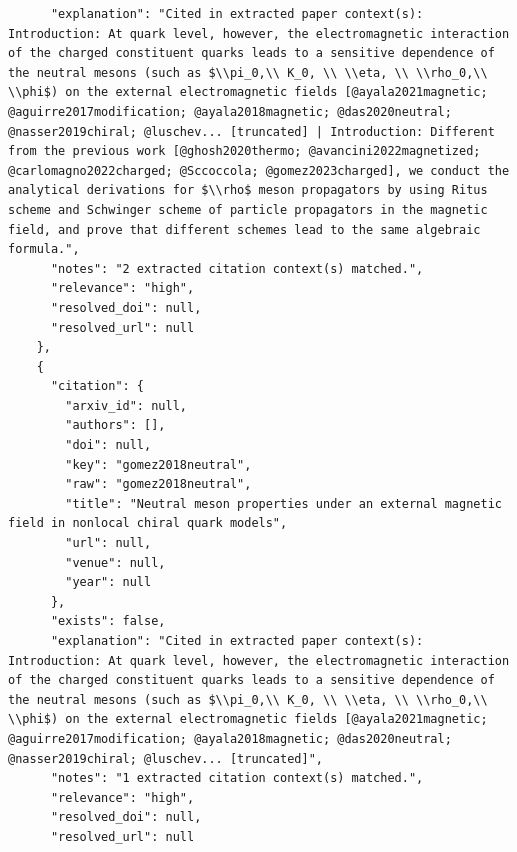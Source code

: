 \documentclass[11pt]{article}
\begin{document}
\begin{verbatim}
      "explanation": "Cited in extracted paper context(s): Introduction: At quark level, however, the electromagnetic interaction of the charged constituent quarks leads to a sensitive dependence of the neutral mesons (such as $\\pi_0,\\ K_0, \\ \\eta, \\ \\rho_0,\\ \\phi$) on the external electromagnetic fields [@ayala2021magnetic; @aguirre2017modification; @ayala2018magnetic; @das2020neutral; @nasser2019chiral; @luschev... [truncated] | Introduction: Different from the previous work [@ghosh2020thermo; @avancini2022magnetized; @carlomagno2022charged; @Sccoccola; @gomez2023charged], we conduct the analytical derivations for $\\rho$ meson propagators by using Ritus scheme and Schwinger scheme of particle propagators in the magnetic field, and prove that different schemes lead to the same algebraic formula.",
      "notes": "2 extracted citation context(s) matched.",
      "relevance": "high",
      "resolved_doi": null,
      "resolved_url": null
    },
    {
      "citation": {
        "arxiv_id": null,
        "authors": [],
        "doi": null,
        "key": "gomez2018neutral",
        "raw": "gomez2018neutral",
        "title": "Neutral meson properties under an external magnetic field in nonlocal chiral quark models",
        "url": null,
        "venue": null,
        "year": null
      },
      "exists": false,
      "explanation": "Cited in extracted paper context(s): Introduction: At quark level, however, the electromagnetic interaction of the charged constituent quarks leads to a sensitive dependence of the neutral mesons (such as $\\pi_0,\\ K_0, \\ \\eta, \\ \\rho_0,\\ \\phi$) on the external electromagnetic fields [@ayala2021magnetic; @aguirre2017modification; @ayala2018magnetic; @das2020neutral; @nasser2019chiral; @luschev... [truncated]",
      "notes": "1 extracted citation context(s) matched.",
      "relevance": "high",
      "resolved_doi": null,
      "resolved_url": null

\end{verbatim}
\end{document}
